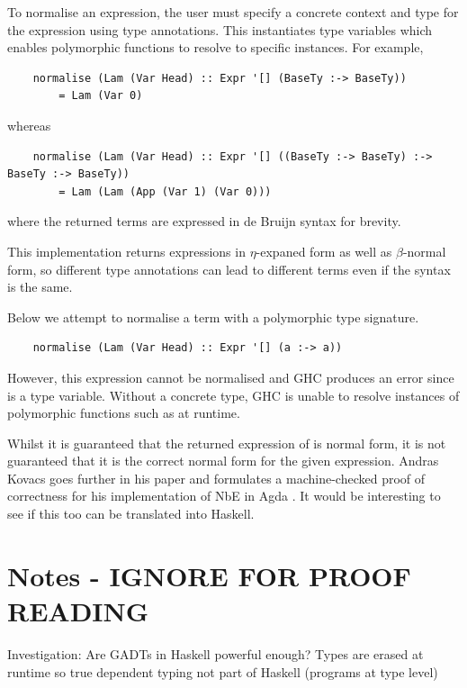 To normalise an expression, the user must specify a concrete context and type for the expression using type annotations. This instantiates type variables which enables polymorphic functions to resolve to specific instances. For example,

\begin{lstlisting}
    normalise (Lam (Var Head) :: Expr '[] (BaseTy :-> BaseTy)) 
        = Lam (Var 0)
\end{lstlisting}

whereas

\begin{lstlisting}
    normalise (Lam (Var Head) :: Expr '[] ((BaseTy :-> BaseTy) :-> BaseTy :-> BaseTy))
        = Lam (Lam (App (Var 1) (Var 0)))
\end{lstlisting}

where the returned terms are expressed in de Bruijn syntax for brevity.

This implementation returns expressions in $\eta$-expaned form as well as $\beta$-normal form, so different type annotations can lead to different terms even if the syntax is the same. 

Below we attempt to normalise a term with a polymorphic type signature.

\begin{lstlisting}
    normalise (Lam (Var Head) :: Expr '[] (a :-> a))
\end{lstlisting}

However, this expression cannot be normalised and GHC produces an error since  is a type variable. Without a concrete type, GHC is unable to resolve instances of polymorphic functions such as  at runtime.

Whilst it is guaranteed that the returned expression of  is normal form, it is not guaranteed that it is the correct normal form for the given expression. Andras Kovacs goes further in his paper and formulates a machine-checked proof of correctness for his implementation of NbE in Agda \cite{AgdaNbe}. It would be interesting to see if this too can be translated into Haskell.


\section{Notes - IGNORE FOR PROOF READING}

Investigation: Are GADTs in Haskell powerful enough? Types are erased at runtime so true dependent typing not part of Haskell (programs at type level)

